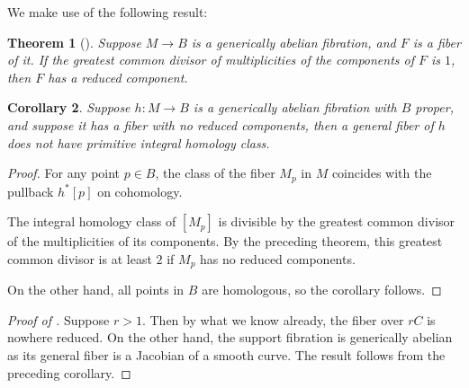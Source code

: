 \documentclass{amsart}
\theoremstyle{plain}
\newtheorem{theorem}{Theorem}[section]
\newtheorem{corollary}[theorem]{Corollary}
\theoremstyle{definition}
\theoremstyle{remark}
\begin{document}
We make use of the following result:
\begin{theorem}[\cite{CKV,lu_preprint_01}]
    Suppose $M\to B$ is a generically abelian fibration, and $F$ is a fiber of it.
    If the greatest common divisor of multiplicities of the components of $F$ is $1$, then $F$ has a reduced component.
\end{theorem}
\begin{corollary}
    Suppose $h:M\to B$ is a generically abelian fibration with $B$ proper, and suppose it has a fiber with no reduced components, then a general fiber of $h$ does not have primitive integral homology class.
\end{corollary}
\begin{proof}
    For any point $p\in B$, the class of the fiber $M_p$ in $M$ coincides with the pullback $h^\ast[p]$ on cohomology.

    The integral homology class of $[M_p]$ is divisible by the greatest common divisor of the multiplicities of its components.
    By the preceding theorem, this greatest common divisor is at least $2$ if $M_p$ has no reduced components.

    On the other hand, all points in $B$ are homologous, so the corollary follows.
\end{proof}
\begin{proof}[Proof of ]
    Suppose $r>1$.
    Then by what we know already, the fiber over $rC$ is nowhere reduced.
    On the other hand, the support fibration is generically abelian as its general fiber is a Jacobian of a smooth curve.
    The result follows from the preceding corollary.
\end{proof}



\end{document}
